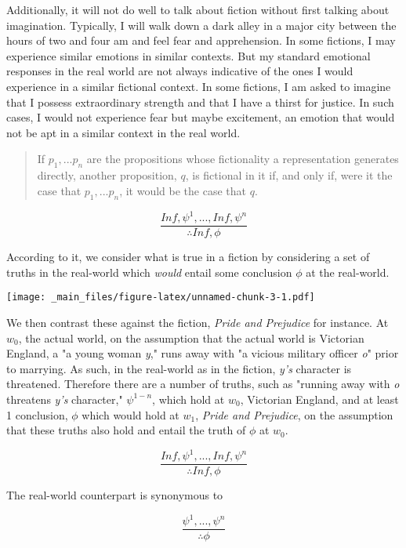 \documentclass[12pt]{book}
\theoremstyle{definition}
\theoremstyle{remark}
\newcommand{\pandocbounded}[1]{#1}
\begin{document}
Additionally, it will not do well to talk about fiction without first talking about imagination. Typically, I will walk down a dark alley in a major city between the hours of two and four am and feel fear and apprehension. In some fictions, I may experience similar emotions in similar contexts. But my standard emotional responses in the real world are not always indicative of the ones I would experience in a similar fictional context. In some fictions, I am asked to imagine that I possess extraordinary strength and that I have a thirst for justice. In such cases, I would not experience fear but maybe excitement, an emotion that would not be apt in a similar context in the real world.

\begin{quote}
If \(p_{1}, . . . p_{n}\) are the propositions whose fictionality a representation generates directly, another proposition, \(q\), is fictional in it if, and only if, were it the case that \(p_{1}, . . . p_{n}\), it would be the case that \(q\).
\end{quote}

\[\frac{In f, \psi^{1}, . . ., In f, \psi^{n}}{\therefore In f, \phi}\]

According to it, we consider what is true in a fiction by considering a set of truths in the real-world which \emph{would} entail some conclusion \(\phi\) at the real-world.

\pandocbounded{\texttt{[image: \_main\_files/figure-latex/unnamed-chunk-3-1.pdf]}}

We then contrast these against the fiction, \emph{Pride and Prejudice} for instance. At \(w_{0}\), the actual world, on the assumption that the actual world is Victorian England, a "a young woman \emph{y}," runs away with "a vicious military officer \emph{o}" prior to marrying. As such, in the real-world as in the fiction, \emph{y's} character is threatened. Therefore there are a number of truths, such as "running away with \emph{o} threatens \emph{y's} character," \(\psi^{1-n}\), which hold at \(w_{0}\), Victorian England, and at least 1 conclusion, \(\phi\) which would hold at \(w_{1}\), \emph{Pride and Prejudice}, on the assumption that these truths also hold and entail the truth of \(\phi\) at \(w_{0}\).

\[\frac{In f, \psi^{1}, . . ., In f, \psi^{n}}{\therefore In f, \phi}\]

\noindent The real-world counterpart is synonymous to

\[\frac{\psi^{1}, . . ., \psi^{n}}{\therefore\phi}\]
\end{document}
